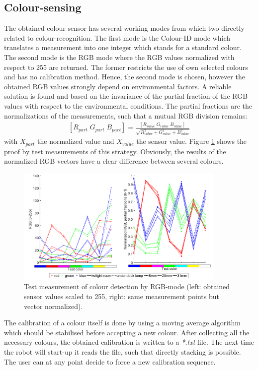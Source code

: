 \documentclass{article}
\begin{document}
	\subsection{Colour-sensing}
	\par The obtained colour sensor has several working modes from which two directly related to colour-recognition. The first mode is the Colour-ID mode which translates a measurement into one integer which stands for a standard colour. The second mode is the RGB mode where the RGB values normalized with respect to 255 are returned. The former restricts the use of own selected colours and has no calibration method. Hence, the second mode is chosen, however the obtained RGB values strongly depend on environmental factors. A reliable solution is found and based on the invariance of the partial fraction of the RGB values with respect to the environmental conditions. The partial fractions are the normalizations of the measurements, such that a mutual RGB division remains:
	\begin{eqnarray}
	\left[R_{part} \; G_{part} \; B_{part}\right] = \frac{\left[R_{value} \; G_{value} \; B_{value}\right]}{\sqrt{R_{value}^2+G_{value}^2+B_{value}^2}}
	\end{eqnarray}
	with $X_{part}$ the normalized value and $X_{value}$ the sensor value.
	Figure \ref{fig:Calibration_ColourSensor} shows the proof by test measurements of this strategy. Obviously, the results of the normalized RGB vectors have a clear difference between several colours.
	\begin{figure}[H]
		\centering
		\includegraphics[keepaspectratio, width = 0.9\textwidth]{Figures/ColorSensor_Light_Dark_20180316.pdf}
		\caption{Test measurement of colour detection by RGB-mode (left: obtained sensor values scaled to 255, right: same measurement points but vector normalized).}
		\label{fig:Calibration_ColourSensor}
	\end{figure}
	\par The calibration of a colour itself is done by using a moving average algorithm which should be stabilised before accepting a new colour. After collecting all the necessary colours, the obtained calibration is written to a \textit{*.txt} file. The next time the robot will start-up it reads the file, such that directly stacking is possible. The user can at any point decide to force a new calibration sequence.
	
\end{document}
